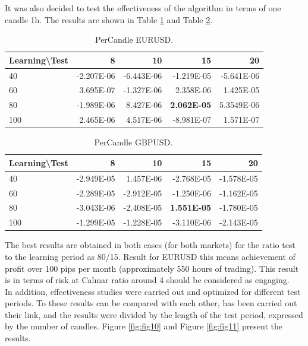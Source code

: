 \documentclass[runningheads,a4paper]{llncs}
\begin{document}
It was also decided to test the effectiveness of the algorithm in terms of one candle 1h. The results are shown in Table \ref{tab:tab3} and Table \ref{tab:tab4}.

\begin{table}[h!]
\centering
\caption{PerCandle EURUSD.}
\label{tab:tab3}
\begin{tabular}{|l|r|r|r|r|} \hline
Learning\textbackslash Test &	8	 &	10 &		15	 &	20\\ \hline
40 &		-2.207E-06 &		-6.443E-06 &		-1.219E-05 &		-5.641E-06\\ \hline
60 &		3.695E-07 &		-1.327E-06 &		2.358E-06 &		1.425E-05\\ \hline
80 &		-1.989E-06 &		8.427E-06	 &	\textbf{2.062E-05} &		5.3549E-06\\ \hline
100	 &	2.465E-06 &		4.517E-06 &		-8.981E-07 &		1.571E-07\\ \hline
\end{tabular}
\end{table}
\FloatBarrier

\begin{table}[h!]
\centering
\caption{PerCandle GBPUSD.}
\label{tab:tab4}
\begin{tabular}{|l|r|r|r|r|} \hline
Learning\textbackslash Test &	8	 & 	10 &		15	 &	20\\ \hline
40	 & -2.949E-05 & 	1.457E-06 & 	-2.768E-05	 & -1.578E-05\\ \hline
60	 & -2.289E-05 & 	-2.912E-05 & 	-1.250E-06 & 	-1.162E-05\\ \hline
80	 & -3.043E-06 & 	-2.408E-05	 & \textbf{1.551E-05} & 	-1.780E-05\\ \hline
100	 & -1.299E-05 & 	-1.228E-05 & 	-3.110E-06	 & -2.143E-05\\ \hline
\end{tabular}
\end{table}
\FloatBarrier


The best results are obtained in both cases (for both markets) for the ratio test to the learning period as 80/15. Result for EURUSD this means achievement of profit over 100 pips per month (approximately 550 hours of trading). This result is in terms of risk at Calmar ratio around 4 should be considered as engaging.\\

In addition, effectiveness studies were carried out and optimized for different test periods. To these results can be compared with each other, has been carried out their link, and the results were divided by the length of the test period, expressed by the number of candles. 
Figure \ref{fig:fig10} and Figure \ref{fig:fig11} present the results.
\end{document}
